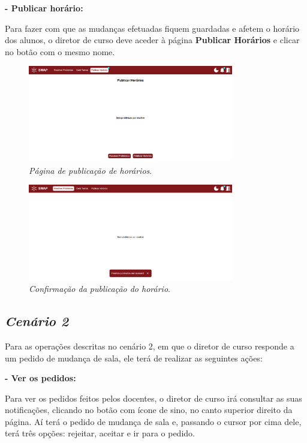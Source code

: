 \documentclass[12pt, a4paper]{article}
\begin{document}
\textbf{- Publicar horário:}

Para fazer com que as mudanças efetuadas fiquem guardadas e afetem o horário dos alunos,
o diretor de curso deve aceder à página \textbf{Publicar Horários} e clicar no botão
com o mesmo nome.

\begin{figure}[H]
    \centering
    \includegraphics[width=0.8\textwidth]{res/manual/publicar_horario.png}
    \caption{\emph{Página de publicação de horários}.}
    \label{publicar_horarios}
\end{figure}

\begin{figure}[H]
    \centering
    \includegraphics[width=0.8\textwidth]{res/manual/toast_horario_publicado.png}
    \caption{\emph{Confirmação da publicação do horário}.}
    \label{toast_horario_publicado}
\end{figure}

\subsection{\emph{Cenário 2}}

Para as operações descritas no cenário 2, em que o diretor de curso responde a um
pedido de mudança de sala, ele terá de realizar as seguintes ações:

\textbf{- Ver os pedidos:}

Para ver os pedidos feitos pelos docentes, o diretor de curso irá consultar as suas notificações,
clicando no botão com ícone de sino, no canto superior direito da página.
Aí terá o pedido de mudança de sala e, passando o cursor por cima dele, terá três opções: rejeitar,
aceitar e ir para o pedido.
\end{document}
